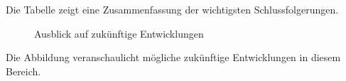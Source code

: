 Die Tabelle zeigt eine Zusammenfassung der wichtigsten Schlussfolgerungen.

\begin{figure}[htbp]
\centering
\caption{Ausblick auf zukünftige Entwicklungen}
\label{fig:ausblick}
\end{figure}

Die Abbildung veranschaulicht mögliche zukünftige Entwicklungen in diesem Bereich.

